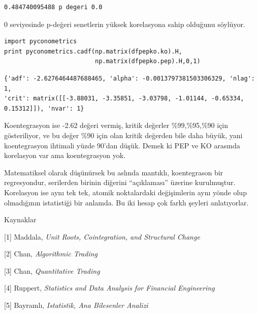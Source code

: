 \documentclass[12pt,fleqn]{article}\usepackage{../../common}
\begin{document}
\begin{verbatim}
0.484740095488 p degeri 0.0
\end{verbatim}

0 seviyesinde p-değeri senetlerin yüksek korelasyona sahip olduğunu
söylüyor. 

\begin{verbatim}
import pyconometrics
print pyconometrics.cadf(np.matrix(dfpepko.ko).H,
                         np.matrix(dfpepko.pep).H,0,1)
\end{verbatim}

\begin{verbatim}
{'adf': -2.6276464487688465, 'alpha': -0.0013797381503306329, 'nlag': 1,
'crit': matrix([[-3.88031, -3.35851, -3.03798, -1.01144, -0.65334,
0.15312]]), 'nvar': 1} 
\end{verbatim}

Koentegrasyon ise -2.62 değeri vermiş, kritik değerler \%99,\%95,\%90 için
gösteriliyor, ve bu değer \%90 için olan kritik değerden bile daha büyük,
yani koentegrasyon ihtimali yüzde 90'dan düşük. Demek ki PEP ve KO arasında
korelasyon var ama koentegrasyon yok.

Matematiksel olarak düşünürsek bu aslında mantıklı, koentegrason bir
regresyondur, serilerden birinin diğerini ``açıklaması'' üzerine
kurulmuştur. Korelasyon ise aynı tek tek, atomik noktalardaki değişimlerin
aynı yönde olup olmadığının istatistiği bir anlamda. Bu iki hesap çok
farklı şeyleri anlatıyorlar.

Kaynaklar 

[1] Maddala, {\em Unit Roots, Cointegration, and Structural Change}

[2] Chan, {\em Algorithmic Trading}

[3] Chan, {\em Quantitative Trading}

[4] Ruppert, {\em Statistics and Data Analysis for Financial Engineering}

[5] Bayramlı, {\em Istatistik, Ana Bilesenler Analizi}
\end{document}

